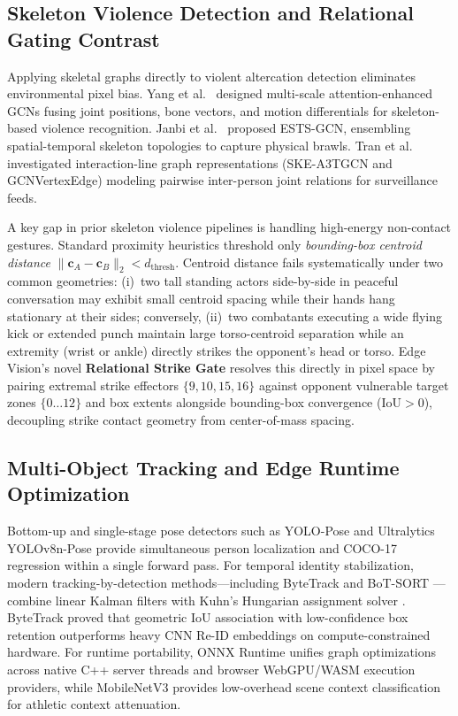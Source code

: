 \documentclass[conference]{IEEEtran}
\begin{document}
\subsection{Skeleton Violence Detection and Relational Gating Contrast}
Applying skeletal graphs directly to violent altercation detection eliminates environmental pixel bias. Yang et al.~\cite{b20} designed multi-scale attention-enhanced GCNs fusing joint positions, bone vectors, and motion differentials for skeleton-based violence recognition. Janbi et al.~\cite{b21} proposed ESTS-GCN, ensembling spatial-temporal skeleton topologies to capture physical brawls. Tran et al.~\cite{b22} investigated interaction-line graph representations (SKE-A3TGCN and GCNVertexEdge) modeling pairwise inter-person joint relations for surveillance feeds.

A key gap in prior skeleton violence pipelines is handling high-energy non-contact gestures. Standard proximity heuristics threshold only \emph{bounding-box centroid distance} $\|\mathbf{c}_A - \mathbf{c}_B\|_2 < d_{\text{thresh}}$. Centroid distance fails systematically under two common geometries: (i)~two tall standing actors side-by-side in peaceful conversation may exhibit small centroid spacing while their hands hang stationary at their sides; conversely, (ii)~two combatants executing a wide flying kick or extended punch maintain large torso-centroid separation while an extremity (wrist or ankle) directly strikes the opponent's head or torso. Edge Vision's novel \textbf{Relational Strike Gate} resolves this directly in pixel space by pairing extremal strike effectors $\{9, 10, 15, 16\}$ against opponent vulnerable target zones $\{0\dots 12\}$ and box extents alongside bounding-box convergence ($\text{IoU} > 0$), decoupling strike contact geometry from center-of-mass spacing.

\subsection{Multi-Object Tracking and Edge Runtime Optimization}
Bottom-up and single-stage pose detectors such as YOLO-Pose \cite{b23} and Ultralytics \mbox{YOLOv8n-Pose} \cite{b3} provide simultaneous person localization and COCO-17 regression within a single forward pass. For temporal identity stabilization, modern tracking-by-detection methods—including ByteTrack \cite{b24} and BoT-SORT \cite{b25}—combine linear Kalman filters with Kuhn's Hungarian assignment solver \cite{b4}. ByteTrack proved that geometric IoU association with low-confidence box retention outperforms heavy CNN Re-ID embeddings on compute-constrained hardware. For runtime portability, ONNX Runtime \cite{b26} unifies graph optimizations across native C++ server threads and browser WebGPU/WASM execution providers, while MobileNetV3 \cite{b27} provides low-overhead scene context classification for athletic context attenuation.
\end{document}
